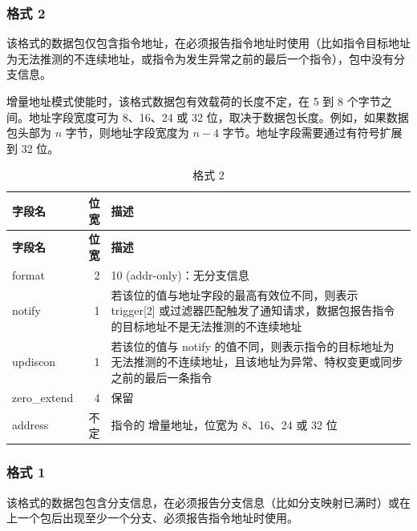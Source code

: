 \documentclass[main\_\_CN.tex]{subfiles}
\begin{document}
\subsubsection{格式 2}

该格式的数据包仅包含指令地址，在必须报告指令地址时使用（比如指令目标地址为无法推测的不连续地址，或指令为发生异常之前的最后一个指令），包中没有分支信息。

增量地址模式使能时，该格式数据包有效载荷的长度不定，在 5 到 8 个字节之间。地址字段宽度可为 8、16、24 或 32 位，取决于数据包长度。例如，如果数据包头部为 $n$ 字节，则地址字段宽度为 $n-4$ 字节。地址字段需要通过有符号扩展到 32 位。

\begin{longtable}[c]{ |l|r|L{10cm}| }
    \caption{格式 2}
    \label{tab:f2}
    \\\hline{}
    \textbf{字段名} & \textbf{位宽} & \textbf{描述} \\\hline
    \endfirsthead
    \hline
    \textbf{字段名} & \textbf{位宽} & \textbf{描述} \\\hline
    \endhead
    \endfoot
    \endlastfoot

    format & 2 & 10 (addr-only)：无分支信息 \\\hline
    notify & 1 & 若该位的值与地址字段的最高有效位不同，则表示 trigger[2] 或过滤器匹配触发了通知请求，数据包报告指令的目标地址不是无法推测的不连续地址 \\\hline
    updiscon & 1 & 若该位的值与 notify 的值不同，则表示指令的目标地址为无法推测的不连续地址，且该地址为异常、特权变更或同步之前的最后一条指令 \\\hline
    zero\_extend & 4 & 保留 \\\hline
    address & 不定 & 指令的 增量地址，位宽为 8、16、24 或 32 位 \\\hline
 \end{longtable}


\subsubsection{格式 1}

该格式的数据包包含分支信息，在必须报告分支信息（比如分支映射已满时）或在上一个包后出现至少一个分支、必须报告指令地址时使用。
\end{document}
